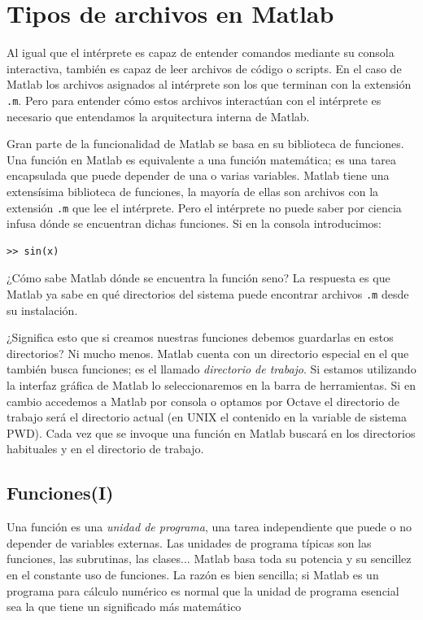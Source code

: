 \section{Tipos de archivos en Matlab}

Al igual que el intérprete es capaz de entender comandos mediante su
consola interactiva, también es capaz de leer archivos de código o
scripts. En el caso de Matlab los archivos asignados al intérprete
son los que terminan con la extensión \texttt{.m}. Pero para entender
cómo estos archivos interactúan con el intérprete es necesario 
que entendamos la arquitectura interna de Matlab.

Gran parte de la funcionalidad de Matlab se basa en su biblioteca de
funciones.  Una función en Matlab es equivalente a una función
matemática; es una tarea encapsulada que puede depender de una o
varias variables.  Matlab tiene una extensísima biblioteca de funciones, 
la mayoría de ellas son archivos con la extensión \texttt{.m} que
lee el intérprete.  Pero el intérprete no puede saber por ciencia infusa
dónde se encuentran dichas funciones.  Si en la consola introducimos:
\begin{verbatim}
>> sin(x)
\end{verbatim}
¿Cómo sabe Matlab dónde se encuentra la función seno?  La respuesta es
que Matlab ya sabe en qué directorios del sistema puede encontrar
archivos \texttt{.m} desde su instalación.

¿Significa esto que si creamos nuestras funciones debemos guardarlas
en estos directorios?  Ni mucho menos.  Matlab cuenta con un directorio
especial en el que también busca funciones; es el llamado \emph{directorio
de trabajo}.  Si estamos utilizando la interfaz gráfica de Matlab lo
seleccionaremos en la barra de herramientas.  Si en cambio accedemos 
a Matlab por consola o optamos por Octave el directorio de trabajo
será el directorio actual (en UNIX el contenido en la variable de
sistema PWD).  Cada vez que se invoque una función en Matlab buscará
en los directorios habituales y en el directorio de trabajo.

\subsection{Funciones(I)\label{sub:Funciones(I)}}

Una función es una \emph{unidad de programa}, una tarea
independiente que puede o no depender de variables externas.  Las unidades
de programa típicas son las funciones, las subrutinas, las clases...
Matlab basa toda su potencia y su sencillez en el constante uso de
funciones.  La razón es bien sencilla; si Matlab es un programa para
cálculo numérico es normal que la unidad de programa esencial sea
la que tiene un significado más matemático

